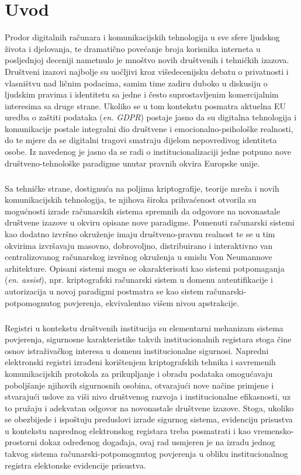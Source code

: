 \chapter{Uvod}
Prodor digitalnih računara i komunikacijskih tehnologija u sve sfere ljudskog života i djelovanja, te dramatično povećanje broja korisnika interneta u posljednjoj deceniji nametnulo je mnoštvo novih društvenih i tehničkih izazova. Društveni izazovi najbolje su uočljivi kroz višedecenijsku debatu o privatnosti i vlasništvu nad ličnim podacima, samim time zadiru duboko u diskusiju o ljudskim pravima i identitetu sa jedne i često suprostavljenim komercijalnim interesima sa druge strane. Ukoliko se u tom kontekstu posmatra aktuelna EU uredba o zaštiti podataka\cite{gdpr} (\textit{en. GDPR}) postaje jasno da su digitalna tehnologija i komunikacije postale integralni dio društvene i emocionalno-psihološke realnosti\cite{Searle1995}, do te mjere da se digitalni tragovi smatraju dijelom nepovredivog identiteta osobe. Iz navedenog je jasno da se radi o institucionalizaciji jedne potpuno nove društveno-tehnološke paradigme unutar pravnih okvira Europske unije.

\paragraph*{}
Sa tehničke strane, dostignuća na poljima kriptografije, teorije mreža i novih komunikacijskih tehnologija, te njihova široka prihvaćenost otvorila su mogućnosti izrade računarskih sistema spremnih da odgovore na novonastale društvene izazove u okviru opisane nove paradigme. Pomenuti računarski sistemi kao dodatno izvršno okruženje imaju društveno-pravnu realnost te se u tim okvirima izvršavaju masovno, dobrovoljno, distribuirano i interaktivno\cite{Cahill2003} van centralizovanog računarskog izvršnog okruženja u smislu Von Neumannove arhitekture. Opisani sistemi mogu se okarakterisati kao sistemi potpomaganja (\textit{en. assist}), npr. kriptografski računarski sistem u domenu autentifikacije i autorizacija u novoj paradigmi postmatra se kao sistem računarski-potpomognutog povjerenja, ekvivalentno višem nivou apstrakcije.

\paragraph*{}
Registri u kontekstu društvenih institucija su elementarni mehanizam sistema povjerenja, sigurnosne karakteristike takvih institucionalnih registara stoga čine osnov istraživačkog interesa u domenu institucionalne sigurnosi. Napredni elektronski registri izrađeni korištenjem kriptografskih tehnika i savremenih komunikacijskih protokola za prikupljanje i obradu podataka omogućavaju poboljšanje njihovih sigurnosnih osobina, otvarajući nove načine primjene i stvarajući uslove za viši nivo društvenog razvoja i institucionalne efikasnosti, uz to pružaju i adekvatan odgovor na novonastale društvene izazove. Stoga, ukoliko se obezbijede i ispoštuju preduslovi izrade sigurnog sistema\cite{iso2013iso}, evidenciju prisustva u kontekstu naprednog elektronskog registara treba posmatrati i kao vremensko-prostorni dokaz određenog događaja, ovaj rad usmjeren je na izradu jednog takvog sistema računarski-potpomognutog povjerenja u obliku institucionalnog registra elektonske evidencije prisustva.